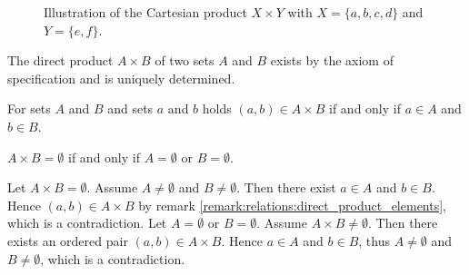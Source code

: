 \begin{figure}[ht]
    \centering

    \caption{Illustration of the Cartesian product $X\times Y$ with $X=\{a,b,c,d\}$ and $Y=\{e,f\}$.}\label{figure:sets:cartesian_product}
\end{figure}

\begin{remarks}
    \begin{remarkenumerate}
        \item The direct product $A\times B$ of two sets $A$ and $B$ exists by the axiom of specification and is uniquely determined.
        \item\label{remark:relations:direct_product_elements} For sets $A$ and $B$ and sets $a$ and $b$ holds $(a,b)\in A\times B$ if and only if $a\in A$ and $b\in B$.
        \item $A\times B=\emptyset$ if and only if $A=\emptyset$ or $B=\emptyset$.
        \begin{miniproof}
            \proofright Let $A\times B=\emptyset$. Assume $A\neq\emptyset$ and $B\neq\emptyset$. Then there exist $a\in A$ and $b\in B$. Hence $(a,b)\in A\times B$ by remark \ref{remark:relations:direct_product_elements}, which is a contradiction.
            \proofleft Let $A=\emptyset$ or $B=\emptyset$. Assume $A\times B\neq\emptyset$. Then there exists an ordered pair $(a,b)\in A\times B$. Hence $a\in A$ and $b\in B$, thus $A\neq\emptyset$ and $B\neq\emptyset$, which is a contradiction.
        \end{miniproof}
    \end{remarkenumerate}
\end{remarks}

